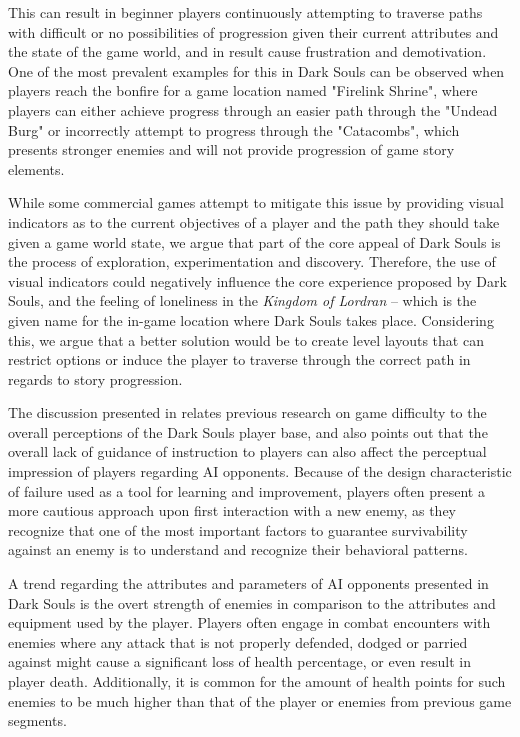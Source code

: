 This can result in beginner players continuously attempting to traverse paths with difficult or no possibilities of progression given their current attributes and the state of the game world, and in result cause frustration and demotivation. One of the most prevalent examples for this in Dark Souls can be observed when players reach the bonfire for a game location named "Firelink Shrine", where players can either achieve progress through an easier path through the "Undead Burg" or incorrectly attempt to progress through the "Catacombs", which presents stronger enemies and will not provide progression of game story elements.

While some commercial games attempt to mitigate this issue by providing visual indicators as to the current objectives of a player and the path they should take given a game world state, we argue that part of the core appeal of Dark Souls is the process of exploration, experimentation and discovery. Therefore, the use of visual indicators could negatively influence the core experience proposed by Dark Souls, and the feeling of loneliness in the \emph{Kingdom of Lordran} -- which is the given name for the in-game location where Dark Souls takes place. Considering this, we argue that a better solution would be to create level layouts that can restrict options or induce the player to traverse through the correct path in regards to story progression.


The discussion presented in \cite{YT_DarkSoulsSimpleAI} relates previous research on game difficulty to the overall perceptions of the Dark Souls player base, and also points out that the overall lack of guidance of instruction to players can also affect the perceptual impression of players regarding AI opponents. Because of the design characteristic of failure used as a tool for learning and improvement, players often present a more cautious approach upon first interaction with a new enemy, as they recognize that one of the most important factors to guarantee survivability against an enemy is to understand and recognize their behavioral patterns. 

A trend regarding the attributes and parameters of AI opponents presented in Dark Souls is the overt strength of enemies in comparison to the attributes and equipment used by the player.  Players often engage in combat encounters with enemies where any attack that is not properly defended, dodged or parried against might cause a significant loss of health percentage, or even result in player death. Additionally, it is common for the amount of health points for such enemies to be much higher than that of the player or enemies from previous game segments.

